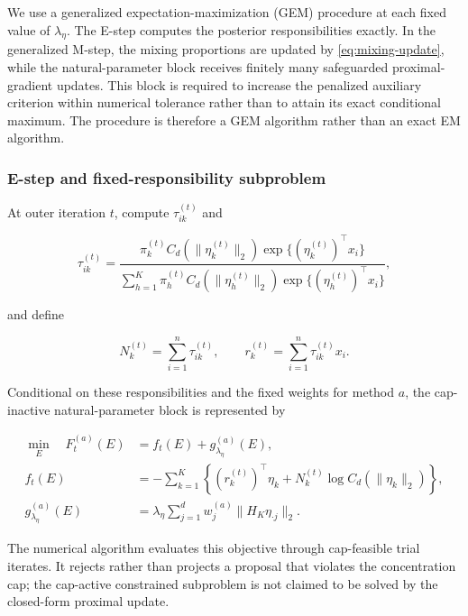 \documentclass[preprint,12pt,authoryear]{elsarticle}
\newcounter{algorithm}
\begin{document}
We use a generalized expectation-maximization (GEM) procedure at each fixed
value of $\lambda_\eta$. The E-step computes the posterior responsibilities
exactly. In the generalized M-step, the mixing proportions are updated by
\eqref{eq:mixing-update}, while the natural-parameter block receives finitely
many safeguarded proximal-gradient updates. This block is required to increase
the penalized auxiliary criterion within numerical tolerance rather than to
attain its exact conditional maximum. The procedure is therefore a GEM
algorithm rather than an exact EM algorithm.

\subsubsection{E-step and fixed-responsibility subproblem}
\label{sec:fixed-responsibility}

At outer iteration $t$, compute $\tau_{ik}^{(t)}$ and

\begin{equation}
\label{eq:responsibilities}
\tau_{ik}^{(t)}
=\frac{\pi_k^{(t)}C_d(\lVert\eta_k^{(t)}\rVert_2)
\exp\{(\eta_k^{(t)})^\top x_i\}}
{\sum_{h=1}^K\pi_h^{(t)}C_d(\lVert\eta_h^{(t)}\rVert_2)
\exp\{(\eta_h^{(t)})^\top x_i\}},
\end{equation}

and define

\[
N_k^{(t)}=\sum_{i=1}^n\tau_{ik}^{(t)},
\qquad
r_k^{(t)}=\sum_{i=1}^n\tau_{ik}^{(t)}x_i.
\]

Conditional on these responsibilities and the fixed weights for method $a$,
the cap-inactive natural-parameter block is represented by

\begin{equation}
\label{eq:fixed-responsibility-objective}
\begin{aligned}
\min_E\quad F_t^{(a)}(E)
&=f_t(E)+g_{\lambda_\eta}^{(a)}(E),\\
f_t(E)
&=-\sum_{k=1}^K
\left\{
(r_k^{(t)})^\top\eta_k
+N_k^{(t)}\log C_d(\lVert\eta_k\rVert_2)
\right\},\\
g_{\lambda_\eta}^{(a)}(E)
&=\lambda_\eta\sum_{j=1}^d
w_j^{(a)}\lVert H_K\eta_{\cdot j}\rVert_2.
\end{aligned}
\end{equation}

The numerical algorithm evaluates this objective through cap-feasible trial
iterates. It rejects rather than projects a proposal that violates the
concentration cap; the cap-active constrained subproblem is not claimed to be
solved by the closed-form proximal update.
\end{document}
